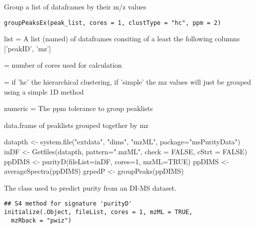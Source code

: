 \documentclass[letterpaper]{book}
\begin{document}
%
\begin{Description}\relax
Group a list of dataframes by their m/z values
\end{Description}
%
\begin{Usage}
\begin{verbatim}
groupPeaksEx(peak_list, cores = 1, clustType = "hc", ppm = 2)
\end{verbatim}
\end{Usage}
%
\begin{Arguments}
\begin{ldescription}
\item[\code{peak\_list}] list = A list (named) of dataframes consiting of a least the following columns ['peakID', 'mz']

\item[\code{cores}] = number of cores used for calculation

\item[\code{clustType}] = if 'hc' the hierarchical clustering, if 'simple' the mz values will just be grouped using a simple 1D method

\item[\code{ppm}] numeric = The ppm tolerance to group peaklists
\end{ldescription}
\end{Arguments}
%
\begin{Value}
data.frame of peaklists grouped together by mz
\end{Value}
%
\begin{Examples}
\begin{ExampleCode}

datapth <- system.file("extdata", "dims", "mzML", package="msPurityData")
inDF <- Getfiles(datapth, pattern=".mzML", check = FALSE, cStrt = FALSE)
ppDIMS <- purityD(fileList=inDF, cores=1, mzML=TRUE)
ppDIMS <- averageSpectra(ppDIMS)
grpedP <- groupPeaks(ppDIMS)
\end{ExampleCode}
\end{Examples}
%
\begin{Description}\relax
The class used to predict purity from an DI-MS dataset.
\end{Description}
%
\begin{Usage}
\begin{verbatim}
## S4 method for signature 'purityD'
initialize(.Object, fileList, cores = 1, mzML = TRUE,
  mzRback = "pwiz")
\end{verbatim}
\end{Usage}
\end{document}
